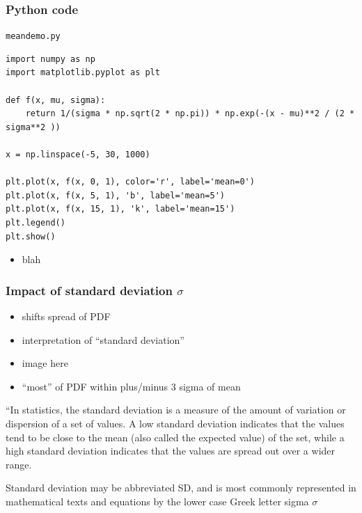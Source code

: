 \documentclass[english,14pt]{beamer}
\begin{document}
\begin{frame}[fragile]

\frametitle{Python code}

\texttt{meandemo.py}
\begin{lstlisting}[style=CStyle,basicstyle=\scriptsize]
import numpy as np
import matplotlib.pyplot as plt

def f(x, mu, sigma):
    return 1/(sigma * np.sqrt(2 * np.pi)) * np.exp(-(x - mu)**2 / (2 * sigma**2 ))

x = np.linspace(-5, 30, 1000)

plt.plot(x, f(x, 0, 1), color='r', label='mean=0')
plt.plot(x, f(x, 5, 1), 'b', label='mean=5')
plt.plot(x, f(x, 15, 1), 'k', label='mean=15')
plt.legend()
plt.show()
\end{lstlisting}

\begin{itemize}
	\item blah
\end{itemize}

\end{frame}


\begin{frame}[fragile]

\frametitle{Impact of standard deviation $\sigma$}

\begin{itemize}
	\item shifts spread of PDF
	\item interpretation of ``standard deviation''
	\item image here
	\item ``most'' of PDF within plus/minus 3 sigma of mean
\end{itemize}


``In statistics, the standard deviation is a measure of the amount of variation or dispersion of a set of values. A low standard deviation indicates that the values tend to be close to the mean (also called the expected value) of the set, while a high standard deviation indicates that the values are spread out over a wider range.

Standard deviation may be abbreviated SD, and is most commonly represented in mathematical texts and equations by the lower case Greek letter sigma $\sigma$

\end{frame}
\end{document}
